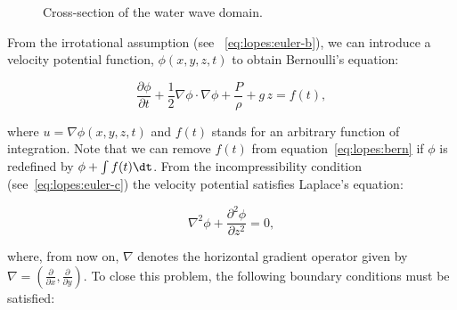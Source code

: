 \begin{figure}
  \begin{center}
  \end{center}
  \caption{Cross-section of the water wave domain.}
  \label{fig:lopes:schematic}
\end{figure}

From the irrotational assumption (see ~\eqref{eq:lopes:euler-b}), we
can introduce a velocity potential function,
$\phi(x,y,z,t)$ to obtain Bernoulli's equation:

\begin{equation}
\label{eq:lopes:bern}
\frac{\partial \phi}{\partial t}+\frac{1}{2}\nabla \phi \cdot\nabla
\phi + \frac{P}{\rho} +g\, z=f(t),
\end{equation}

where $u=\nabla\phi(x,y,z,t)$ and $f(t)$ stands for an arbitrary
function of integration.  Note that we can remove $f(t)$ from
equation~\eqref{eq:lopes:bern} if $\phi$ is redefined by $\phi+\int
f(t) \dt$.  From the incompressibility condition
(see~\eqref{eq:lopes:euler-c}) the velocity potential satisfies
Laplace's equation:

\begin{equation}
  \label{eq:lopes:lap}
  \nabla^2\phi+\frac{\partial^2\phi}{\partial z^2}=0,
\end{equation}

where, from now on, $\nabla$ denotes the horizontal gradient operator
given by $\nabla=\left(\frac{\partial }{\partial
    x},\frac{\partial}{\partial y}\right)\!\!.$ To close this problem,
the following boundary conditions must be satisfied:


